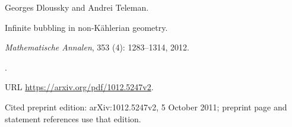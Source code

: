 Georges Dloussky and Andrei Teleman.

\newblock Infinite bubbling in non-{K}{\"a}hlerian geometry.

\newblock \emph{Mathematische Annalen}, 353 (4): 1283--1314,
  2012.

\newblock {}.

\newblock URL \url{https://arxiv.org/pdf/1012.5247v2}.

\newblock Cited preprint edition: arXiv:1012.5247v2, 5 October 2011; preprint page and statement references use that edition.
